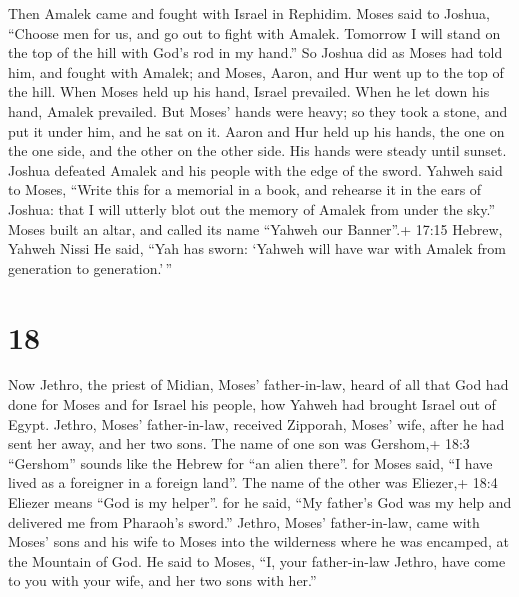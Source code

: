  Then Amalek came and fought with Israel in Rephidim.
 Moses said to Joshua, ``Choose men for us, and go out to
fight with Amalek. Tomorrow I will stand on the top of the hill with
God's rod in my hand.''  So Joshua did as Moses had told
him, and fought with Amalek; and Moses, Aaron, and Hur went up to the
top of the hill.  When Moses held up his hand, Israel
prevailed. When he let down his hand, Amalek prevailed. 
But Moses' hands were heavy; so they took a stone, and put it under him,
and he sat on it. Aaron and Hur held up his hands, the one on the one
side, and the other on the other side. His hands were steady until
sunset.  Joshua defeated Amalek and his people with the
edge of the sword.  Yahweh said to Moses, ``Write this for
a memorial in a book, and rehearse it in the ears of Joshua: that I will
utterly blot out the memory of Amalek from under the sky.''
 Moses built an altar, and called its name ``Yahweh our
Banner''.+ 17:15 Hebrew, Yahweh Nissi  He said, ``Yah has
sworn: `Yahweh will have war with Amalek from generation to
generation.'\,''

\hypertarget{section-17}{%
\section{18}\label{section-17}}

 Now Jethro, the priest of Midian, Moses' father-in-law,
heard of all that God had done for Moses and for Israel his people, how
Yahweh had brought Israel out of Egypt.  Jethro, Moses'
father-in-law, received Zipporah, Moses' wife, after he had sent her
away,  and her two sons. The name of one son was Gershom,+
18:3 ``Gershom'' sounds like the Hebrew for ``an alien there''. for
Moses said, ``I have lived as a foreigner in a foreign land''.
 The name of the other was Eliezer,+ 18:4 Eliezer means
``God is my helper''. for he said, ``My father's God was my help and
delivered me from Pharaoh's sword.''  Jethro, Moses'
father-in-law, came with Moses' sons and his wife to Moses into the
wilderness where he was encamped, at the Mountain of God. 
He said to Moses, ``I, your father-in-law Jethro, have come to you with
your wife, and her two sons with her.''

